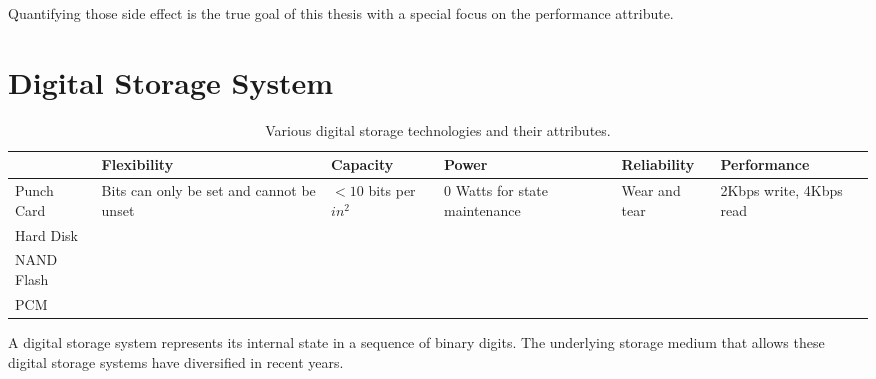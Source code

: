 Quantifying those side effect is the true goal of this thesis with a special focus on the performance attribute.

\section{Digital Storage System}
\begin{table}[t]
\centering
\begin{tabular}{p{1.3cm}||p{2.1cm}|p{2.1cm}|p{2.1cm}|p{2.1cm}|p{2.1cm}}
\hline
\hline
 			& Flexibility & Capacity & Power & Reliability & Performance \\
\hline
\hline
Punch Card		& \raggedright{Bits can only be set and cannot be unset}
							&	\raggedright{$<10$ bits per $in^2$}
							&	\raggedright{$0$ Watts for state maintenance} 
							&	\raggedright{Wear and tear}
							&	2Kbps write, 4Kbps read 
\\
\hline
Hard Disk			& & & & & \\
\hline
NAND Flash		&	&	&	&	&	\\
\hline
PCM						&	&	&	&	&	\\
\hline
\hline
\end{tabular}
\caption{Various digital storage technologies and their attributes.}
\label{tbl:medium}
\end{table}
A digital storage system represents its internal state in a sequence of binary digits. 
The underlying storage medium that allows these digital storage systems have diversified in recent years. 


